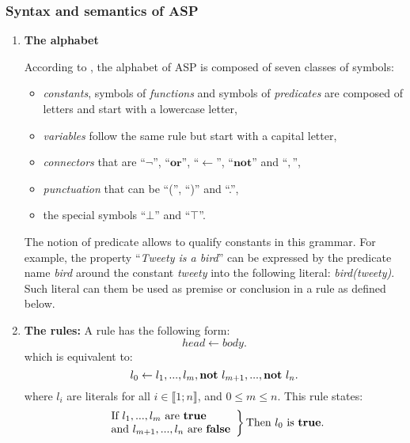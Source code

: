 \subsubsection{Syntax and semantics of ASP}
\label{sectionSyntaxeASP}
\begin{enumerate}

\item \textbf{The alphabet}

According to \cite{baral2003knowledge}, the alphabet of ASP is composed of seven classes of symbols:
\begin{itemize}
  \item \emph{constants}, symbols of \emph{functions} and symbols of \emph{predicates} are composed of letters and start with a lowercase letter,
  \item \emph{variables} follow the same rule but start with a capital letter,
  \item \emph{connectors} that are “$\neg$”, “$\textbf{or}$”, “$\leftarrow$”, “$\textbf{not}$” and “$,$”,
  \item \emph{punctuation} that can be “(”, “)” and “.”,
  \item the special symbols “$\bot$” and “$\top$”.
\end{itemize}

The notion of predicate allows to qualify constants in this grammar.
For example, the property “\textit{Tweety is a bird}”
can be expressed by the predicate name \textit{bird}
around the constant \textit{tweety} into the following literal:
\textit{bird(tweety)}.
Such literal can them be used as premise or conclusion in a rule as defined below.

\item \textbf{The rules:}
A rule has the following form:
\begin{equation} \label{eq1ASP}
 head \leftarrow body.
\end{equation}
which is equivalent to:
\begin{equation} \label{eq2ASP}
l_{0} \leftarrow l_{1},...,l_{m}, \textbf{not}~ l_{m+1},..., \textbf{not}~ l_{n}.
\end{equation}
where $l_{i}$ are literals for all $i \in \llbracket 1 ; n \rrbracket$, and $0 \leq m \leq n$.
This rule states:
\[
\left.
    \begin{array}{ll}
        \text{If} ~ l_{1},...,l_{m}  ~ \text{are \textbf{true}}\\
        \text{and} ~ l_{m+1},...,l_{n} ~ \text{are \textbf{false}}
    \end{array}
\right \} \text{Then} ~ l_{0} ~ \text{is } \textbf{true}.
\]


\end{enumerate}
